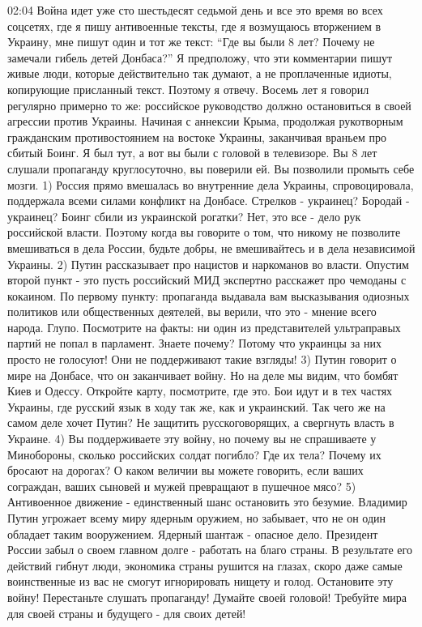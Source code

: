 {%
02:04
Война идет уже сто шестьдесят седьмой день и все это время во всех соцсетях, где я пишу антивоенные тексты, где я возмущаюсь вторжением в Украину, мне пишут один и тот же текст: “Где вы были 8 лет? Почему не замечали гибель детей Донбаса?” Я предположу, что эти комментарии пишут живые люди, которые действительно так думают, а не проплаченные идиоты, копирующие присланный текст. Поэтому я отвечу.
Восемь лет я говорил регулярно примерно то же: российское руководство должно остановиться в своей агрессии против Украины. Начиная с аннексии Крыма, продолжая рукотворным гражданским противостоянием на востоке Украины, заканчивая враньем про сбитый Боинг. Я был тут, а вот вы были с головой в телевизоре. Вы 8 лет слушали пропаганду круглосуточно, вы поверили ей. Вы позволили промыть себе мозги.
1) Россия прямо вмешалась во внутренние дела Украины, спровоцировала, поддержала всеми силами конфликт на Донбасе. Стрелков - украинец? Бородай - украинец? Боинг сбили из украинской рогатки? Нет, это все - дело рук российской власти. Поэтому когда вы говорите о том, что никому не позволите вмешиваться в дела России, будьте добры, не вмешивайтесь и в дела независимой Украины.
2) Путин рассказывает про нацистов и наркоманов во власти. Опустим второй пункт - это пусть российский МИД экспертно расскажет про чемоданы с кокаином. По первому пункту: пропаганда выдавала вам высказывания одиозных политиков или общественных деятелей, вы верили, что это - мнение всего народа. Глупо. Посмотрите на факты: ни один из представителей ультраправых партий не попал в парламент. Знаете почему? Потому что украинцы за них просто не голосуют! Они не поддерживают такие взгляды!
3) Путин говорит о мире на Донбасе, что он заканчивает войну. Но на деле мы видим, что бомбят Киев и Одессу. Откройте карту, посмотрите, где это. Бои идут и в тех частях Украины, где русский язык в ходу так же, как и украинский. Так чего же на самом деле хочет Путин? Не защитить русскоговорящих, а свергнуть власть в Украине.
4) Вы поддерживаете эту войну, но почему вы не спрашиваете у Минобороны, сколько российских солдат погибло? Где их тела? Почему их бросают на дорогах? О каком величии вы можете говорить, если ваших сограждан, ваших сыновей и мужей превращают в пушечное мясо?
5) Антивоенное движение - единственный шанс остановить это безумие. Владимир Путин угрожает всему миру ядерным оружием, но забывает, что не он один обладает таким вооружением. Ядерный шантаж - опасное дело. Президент России забыл о своем главном долге - работать на благо страны. В результате его действий гибнут люди, экономика страны рушится на глазах, скоро даже самые воинственные из вас не смогут игнорировать нищету и голод.
Остановите эту войну! Перестаньте слушать пропаганду! Думайте своей головой! Требуйте мира для своей страны и будущего - для своих детей!

}
